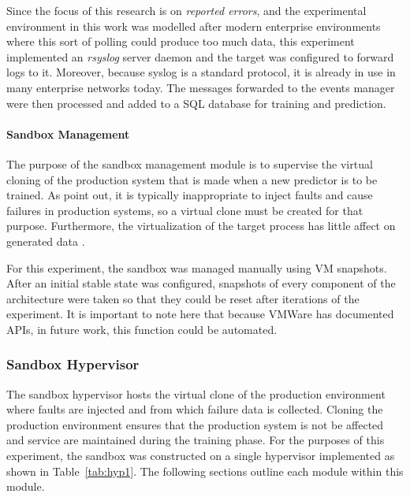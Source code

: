 Since the focus of this research is on \emph{reported errors}, and the
experimental environment in this work was modelled after modern enterprise
environments where this sort of polling could produce too much data, this
experiment implemented an \emph{rsyslog} server daemon and the target was
configured to forward logs to it.  Moreover, because syslog is a standard
protocol, it is already in use in many enterprise networks today.  The messages
forwarded to the events manager were then processed and added to a \ac{SQL}
database for training and prediction.  

\paragraph{Sandbox Management} \label{sec:sandboxMgr} 
The purpose of the sandbox management module is to supervise the virtual
cloning of the production system that is made when a new predictor is to be
trained.  As \citet{irrera2013,irrera2015} point out, it is typically
inappropriate to inject faults and cause failures in production systems, so a
virtual clone must be created for that purpose.  Furthermore, the
virtualization of the target process has little affect on generated data
\citep{irrera2013}.

For this experiment, the sandbox was managed manually using \ac{VM} snapshots.
After an initial stable state was configured, snapshots of every component of
the architecture were taken so that they could be reset after iterations of the
experiment.  It is important to note here that because VMWare has documented
\ac{API}s, in future work, this function could be automated.

\subsubsection{Sandbox Hypervisor} \label{sec:sandbox}
The sandbox hypervisor hosts the virtual clone of the production environment
where faults are injected and from which failure data is collected.  Cloning
the production environment ensures that the production system is not be
affected and service are maintained during the training phase.  For the
purposes of this experiment, the sandbox was constructed on a single hypervisor
implemented as shown in Table~\ref{tab:hyp1}.  The following sections outline
each module within this module.

